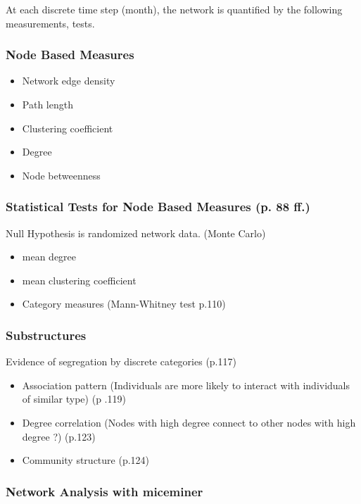 At each discrete time step (month), the network is quantified by the following measurements, tests.

\subsubsection{Node Based Measures}
\label{subsubsec:nodbasmea}

\begin{itemize} 
	\item Network edge density
	\item Path length
	\item Clustering coefficient
	\item Degree	
	\item Node betweenness
\end{itemize}

\subsubsection{Statistical Tests for Node Based Measures (p. 88 ff.)}
\label{subsubsec:stattesnodbasmea}

Null Hypothesis is randomized network data. (Monte Carlo)

\begin{itemize} 
	\item mean degree
	\item mean clustering coefficient
	\item Category measures	(Mann-Whitney test p.110)
\end{itemize}

\subsubsection{Substructures}
\label{subsubsec:substrut}

Evidence of segregation by discrete categories (p.117)

\begin{itemize} 
	\item Association pattern (Individuals are more likely to interact with individuals of similar type) (p .119)
	\item Degree correlation (Nodes with high degree connect to other nodes with high degree ?) (p.123)
	\item Community structure (p.124)
\end{itemize}

\subsubsection{Network Analysis with miceminer}
\label{subsubsec:netanmiceminer}

